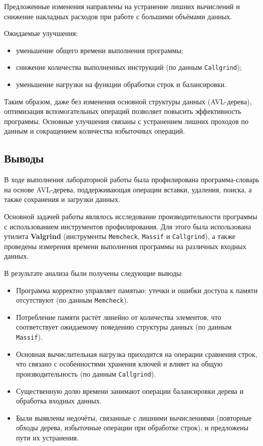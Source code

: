 \documentclass[12pt]{article}
\begin{document}
Предложенные изменения направлены на устранение лишних вычислений и снижение накладных расходов при работе с большими объёмами данных.

Ожидаемые улучшения:
\begin{itemize}
	\item уменьшение общего времени выполнения программы;
	\item снижение количества выполненных инструкций (по данным \texttt{Callgrind});
	\item уменьшение нагрузки на функции обработки строк и балансировки.
\end{itemize}


Таким образом, даже без изменения основной структуры данных (AVL-дерева), оптимизация вспомогательных операций позволяет повысить эффективность программы. Основные улучшения связаны с устранением лишних проходов по данным и сокращением количества избыточных операций.

\subsection*{Выводы}

В ходе выполнения лабораторной работы была профилирована программа-словарь на основе AVL-дерева, поддерживающая операции вставки, удаления, поиска, а также сохранения и загрузки данных.

Основной задачей работы являлось исследование производительности программы с использованием инструментов профилирования. Для этого была использована утилита \textbf{Valgrind} (инструменты \texttt{Memcheck}, \texttt{Massif} и \texttt{Callgrind}), а также проведены измерения времени выполнения программы на различных входных данных.

В результате анализа были получены следующие выводы:

\begin{itemize}
	\item Программа корректно управляет памятью: утечки и ошибки доступа к памяти отсутствуют (по данным \texttt{Memcheck}).
	
	\item Потребление памяти растёт линейно от количества элементов, что соответствует ожидаемому поведению структуры данных (по данным \texttt{Massif}).
	
	\item Основная вычислительная нагрузка приходится на операции сравнения строк, что связано с особенностями хранения ключей и влияет на общую производительность (по данным \texttt{Callgrind}).
	
	\item Существенную долю времени занимают операции балансировки дерева и обработка входных данных.
	
	\item Были выявлены недочёты, связанные с лишними вычислениями (повторные обходы дерева, избыточные операции при обработке строк), и предложены пути их устранения.
\end{itemize}
\end{document}
